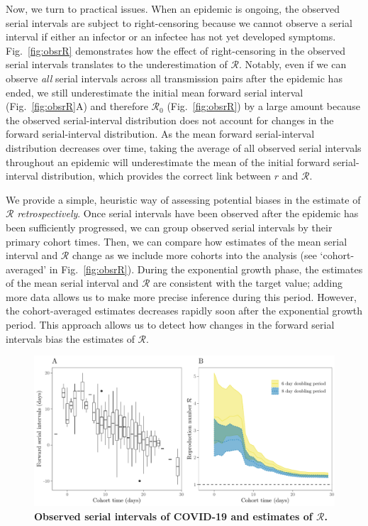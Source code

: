 \documentclass[12pt]{article}
\newcommand{\fref}[1]{Fig.~\ref{fig:#1}}
\begin{document}
Now, we turn to practical issues.
When an epidemic is ongoing, the observed serial intervals are subject to right-censoring because we cannot observe a serial interval if either an infector or an infectee has not yet developed symptoms.
\fref{obsrR} demonstrates how the effect of right-censoring in the observed serial intervals translates to the underestimation of $\mathcal R$.
Notably, even if we can observe \emph{all} serial intervals across all transmission pairs after the epidemic has ended, we still underestimate the initial mean forward serial interval (\fref{obsrR}A) and therefore $\mathcal R_0$ (\fref{obsrR}) by a large amount because the observed serial-interval distribution does not account for changes in the forward serial-interval distribution.
As the mean forward serial-interval distribution decreases over time, taking the average of all observed serial intervals throughout an epidemic will underestimate the mean of the initial forward serial-interval distribution, which provides the correct link between $r$ and $\mathcal R$.

We provide a simple, heuristic way of assessing potential biases in the estimate of $\mathcal R$ \emph{retrospectively}.
Once serial intervals have been observed after the epidemic has been sufficiently progressed, we can group observed serial intervals by their primary cohort times.
Then, we can compare how estimates of the mean serial interval and $\mathcal R$ change as we include more cohorts into the analysis (see `cohort-averaged' in \fref{obsrR}).
During the exponential growth phase, the estimates of the mean serial interval and $\mathcal R$ are consistent with the target value;
adding more data allows us to make more precise inference during this period.
However, the cohort-averaged estimates decreases rapidly soon after the exponential growth period.
This approach allows us to detect how changes in the forward serial intervals bias the estimates of $\mathcal R$.

\begin{figure}[!th]
\includegraphics[width=\textwidth]{serial_analysis.pdf}
\caption{
\textbf{Observed serial intervals of COVID-19 and estimates of $\mathcal R$.}
}
\label{fig:du}
\end{figure}
\end{document}
